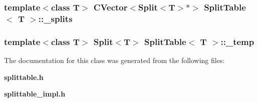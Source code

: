 \subsubsection{\setlength{\rightskip}{0pt plus 5cm}template$<$class T$>$ {\bf CVector}$<${\bf Split}$<$T$>$$\ast$$>$ {\bf Split\-Table}$<$ T $>$::{\bf \_\-splits}\hspace{0.3cm}{\tt  [protected]}}\label{classSplitTable_p0}


\subsubsection{\setlength{\rightskip}{0pt plus 5cm}template$<$class T$>$ {\bf Split}$<$T$>$ {\bf Split\-Table}$<$ T $>$::{\bf \_\-temp}\hspace{0.3cm}{\tt  [protected]}}\label{classSplitTable_p1}




The documentation for this class was generated from the following files:\begin{CompactItemize}
\item 
{\bf splittable.h}\item 
{\bf splittable\_\-impl.h}\end{CompactItemize}
